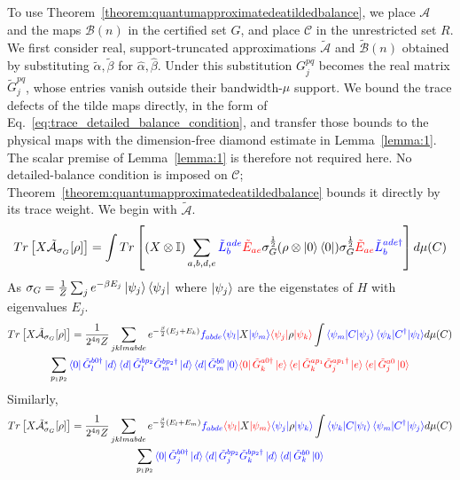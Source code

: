 \documentclass[aps,floatfix,10pt,amssymb,amsfont,amsmath,superscriptaddress,float,nofootinbib,longbibliography,nobalancelastpage,twocolumn]{revtex4-2}
\begin{document}
\begin{widetext}
To use Theorem~\ref{theorem:quantumapproximatedeatildedbalance}, we place $\mathcal{A}$ and the maps $\mathcal{B}(n)$ in the certified set $G$, and place $\mathcal{C}$ in the unrestricted set $R$. We first consider real, support-truncated approximations $\tilde{\mathcal{A}}$ and $\tilde{\mathcal{B}}(n)$ obtained by substituting $\tilde\alpha,\tilde\beta$ for $\hat\alpha,\hat\beta$. Under this substitution $G^{pq}_j$ becomes the real matrix $\tilde G^{pq}_j$, whose entries vanish outside their bandwidth-$\mu$ support. We bound the trace defects of the tilde maps directly, in the form of Eq.~\eqref{eq:trace_detailed_balance_condition}, and transfer those bounds to the physical maps with the dimension-free diamond estimate in Lemma~\ref{lemma:1}. The scalar premise of Lemma~\ref{lemma:1} is therefore not required here. No detailed-balance condition is imposed on $\mathcal{C}$; Theorem~\ref{theorem:quantumapproximatedeatildedbalance} bounds it directly by its trace weight. We begin with $\tilde{\mathcal{A}}$.
    \begin{equation}
    Tr\left[X\tilde{\mathcal{A}}_{\sigma_G}[\rho]\right] = \int Tr\left[(X\otimes \mathbb{I})\sum_{a,b,d,e}\textcolor{blue}{\tilde L^{ade}_b} \textcolor{red}{\tilde E_{ae}} \sigma_G^{\frac{1}{2}} (\rho\otimes \ket{0}\bra{0}) \sigma_G^{\frac{1}{2}}\textcolor{red}{\tilde E_{ae}}\textcolor{blue}{\tilde L^{ade\dagger}_b}\right] d\mu(C)
\end{equation}
As $\sigma_G = \frac{1}{Z}\sum_j e^{-\beta E_j} \ket{\psi_j}\bra{\psi_j}$ where $\ket{\psi_j}$ are the eigenstates of $H$ with eigenvalues $E_j$. 
\begin{multline}
    Tr\left[X\tilde{\mathcal{A}}_{\sigma_G}[\rho]\right] =\frac{1}{2^{4\eta}Z} \sum_{jklmabde} e^{-\frac{\beta}{2}(E_j+E_k)}\textcolor{blue}{f_{abde}} \textcolor{blue}{\bra{\psi_l}}X\textcolor{blue}{\ket{\psi_m}}\textcolor{red}{\bra{\psi_j}}\rho\textcolor{red}{\ket{\psi_k}} \int \textcolor{blue}{\braket{\psi_m|C|\psi_j}\braket{\psi_k|C^{\dagger}|\psi_l}} d\mu(C)\\\sum_{p_1p_2} \textcolor{blue}{\bra{0} \tilde G^{b0\dagger}_l\ket{d}\bra{d}\tilde G^{bp_2}_l\tilde G^{bp_2\dagger}_m\ket{d}\bra{d}\tilde G^{b0}_m\ket{0}}
    \textcolor{red}{\bra{0}\tilde G_k^{a0\dagger}\ket{e}\bra{e}\tilde G_k^{ap_1}\tilde G_j^{ap_1\dagger}\ket{e}\bra{e}\tilde G_j^{a0}\ket{0}}
    \label{eq:Arho}
\end{multline}
Similarly,
\begin{multline}
    Tr\left[X\tilde{\mathcal{A}}^*_{\sigma_G}[\rho]\right] =\frac{1}{2^{4\eta}Z} \sum_{jklmabde} e^{-\frac{\beta}{2}(E_l+E_m)}\textcolor{blue}{f_{abde}} \textcolor{red}{\bra{\psi_l}}X\textcolor{red}{\ket{\psi_m}}\textcolor{blue}{\bra{\psi_j}}\rho\textcolor{blue}{\ket{\psi_k}} \int \textcolor{blue}{\braket{\psi_k|C|\psi_l}\braket{\psi_m|C^{\dagger}|\psi_j}} d\mu(C)\\\sum_{p_1p_2} \textcolor{blue}{\bra{0} \tilde G^{b0\dagger}_j\ket{d}\bra{d}\tilde G^{bp_2}_j\tilde G^{bp_2\dagger}_k\ket{d}\bra{d}\tilde G^{b0}_k\ket{0}}

\end{multline}
\end{widetext}
\end{document}
